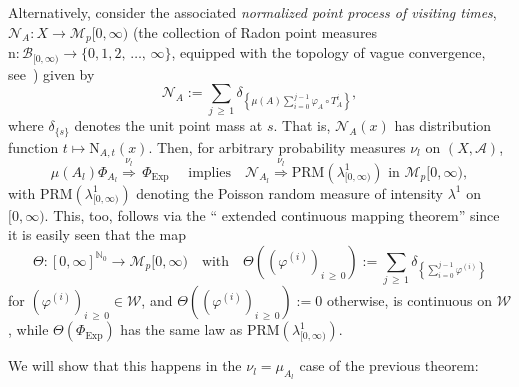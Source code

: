 \documentclass[AHL,Unicode,longabstracts]{cedram}
\newcommand{\clA}{\mathcal{A}}
\newcommand{\clB}{\mathcal{B}}
\newcommand{\clM}{\mathcal{M}}
\newcommand{\clW}{\mathcal{W}}
\newcommand{\clN}{\mathcal{N}}
\newcommand{\Expl}{\mathrm{Exp}}
\newcommand{\rmN}{\mathrm{N}}
\newcommand{\PRM}{\mathrm{PRM}}
\newcommand{\rmnn}{\mathrm{n}}
\newcommand{\bbN}{\mathbb{N}}
\begin{document}
\begin{rema}\label{R_CgePoint1}
Alternatively, consider the associated \emph{normalized point process of visiting times}, $\clN_{A}:X\rightarrow\clM_{p}[0,\infty)$ (the collection of Radon point measures $\rmnn:\clB_{[0,\infty)}\rightarrow\{0,1,2,\,\ldots,\,\infty\}$, equipped with the topology of vague convergence, see~\cite[Chapter~3]{Resnick}) given by
\begin{equation}
\clN_{A}:= {\sum_{j\,\geq\,1}}
\delta_{\left\{\mu(A)\sum\limits_{i=0}^{j-1}\varphi_{A}\circ T_{A}^{i}\right\}},
\end{equation}
where $\delta_{\{s\}}$ denotes the unit point mass at $s$. That is, $\clN_{A}(x)$ has distribution function $t\mapsto\rmN_{A,t}(x)$. Then, for arbitrary probability measures $\nu_{l}$ on $(X,\clA)$,
\begin{equation}
\mu(A_{l})\Phi_{A_{l}}\overset{\nu_{l}}{\Longrightarrow}\,\Phi_{\Expl }\quad\text{ implies} \quad\clN_{A_{l}}\overset{\nu_{l}} {\Longrightarrow}\PRM\left(\lambda_{\lbrack0,\infty)}^{1}\right)\text{ in }\clM_{p}[0,\infty),
\end{equation}
with $\PRM(\lambda_{\lbrack0,\infty)}^{1})$ denoting the Poisson random measure of intensity $\lambda^{1}$ on $[0,\infty)$. This, too, follows via the `` extended continuous mapping theorem'' since it is easily seen that the map 
\[
\Theta :[0,\infty]^{\bbN_{0}}\rightarrow\clM_{p}[0,\infty)\quad\text{with}\quad\Theta\left(\left(\varphi^{(i)}\right)_{i\,\geq\,0}\right):= {\sum_{j\,\geq\,1}}
\delta_{\left\{\sum\limits_{i=0}^{j-1}\varphi^{(i)}\right\}}
\]
for $(\varphi^{(i)})_{i\,\geq\,0}
\in\clW$, and $\Theta((\varphi^{(i)})_{i\,\geq\,0}):=0$ otherwise, is continuous on $\clW$, while $\Theta(\Phi_{\Expl})$ has the same law as $\PRM(\lambda_{\lbrack0,\infty)}^{1})$.
\end{rema}

We will show that this happens in the $\nu_{l}=\mu_{A_{l}}$ case of the previous theorem:
\end{document}
